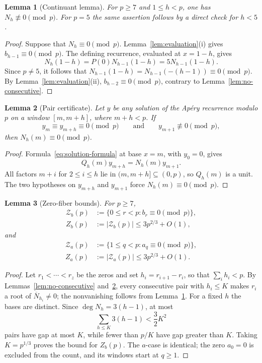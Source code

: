 \documentclass[11pt]{amsart}
\theoremstyle{plain}
\newtheorem{lemma}{Lemma}
\theoremstyle{remark}
\begin{document}
\begin{lemma}[Continuant lemma]\label{lem:continuant}
For $p\geq7$ and $1\leq h<p$, one has
$N_h\not\equiv0\pmod p$.  For $p=5$ the same assertion follows by a
direct check for $h<5$.
\end{lemma}

\begin{proof}
Suppose that $N_h\equiv0\pmod p$.  Lemma~\ref{lem:evaluation}(i) gives
$b_{h-1}\equiv0\pmod p$.  The defining recurrence, evaluated at
$x=1-h$, gives
\[
 N_h(1-h)=P(0)N_{h-1}(1-h)=5N_{h-1}(1-h).
\]
Since $p\neq5$, it follows that
$N_{h-1}(1-h)=N_{h-1}(-(h-1))\equiv0\pmod p$.  By
Lemma~\ref{lem:evaluation}(ii), $b_{h-2}\equiv0\pmod p$, contrary to
Lemma~\ref{lem:no-consecutive}.
\end{proof}

\begin{lemma}[Pair certificate]\label{lem:pair-certificate}
Let $y$ be any solution of the Ap\'ery recurrence modulo $p$ on a window
$[m,m+h]$, where $m+h<p$.  If
\[
 y_m\equiv y_{m+h}\equiv0\pmod p
 \qquad\text{and}\qquad
 y_{m+1}\not\equiv0\pmod p,
\]
then $N_h(m)\equiv0\pmod p$.
\end{lemma}

\begin{proof}
Formula~\eqref{eq:solution-formula} at base $x=m$, with $y_0=0$, gives
\[
 Q_h(m)y_{m+h}=N_h(m)y_{m+1}.
\]
All factors $m+i$ for $2\leq i\leq h$ lie in
$(m,m+h]\subseteq(0,p)$, so $Q_h(m)$ is a unit.  The two hypotheses on
$y_{m+h}$ and $y_{m+1}$ force $N_h(m)\equiv0\pmod p$.
\end{proof}

\begin{lemma}[Zero-fiber bounds]\label{lem:zero-fiber}
For $p\geq7$,
\[
 \begin{aligned}
 \mathcal Z_b(p)&:=\{0\leq r<p:b_r\equiv0\pmod p\},\\
 Z_b(p)&:=|\mathcal Z_b(p)|\leq3p^{2/3}+O(1),
 \end{aligned}
\]
and
\[
 \begin{aligned}
 \mathcal Z_a(p)&:=\{1\leq q<p:a_q\equiv0\pmod p\},\\
 Z_a(p)&:=|\mathcal Z_a(p)|\leq3p^{2/3}+O(1).
 \end{aligned}
\]
\end{lemma}

\begin{proof}
Let $r_1<\cdots<r_z$ be the zeros and set
$h_i=r_{i+1}-r_i$, so that $\sum_i h_i<p$.  By
Lemmas~\ref{lem:no-consecutive} and~\ref{lem:pair-certificate}, every
consecutive pair with $h_i\leq K$ makes $r_i$ a root of
$\overline N_{h_i}\neq0$; the nonvanishing follows from
Lemma~\ref{lem:continuant}.  For a fixed $h$ the bases are distinct.
Since $\deg N_h=3(h-1)$, at most
\[
 \sum_{h\leq K}3(h-1)<\frac32K^2
\]
pairs have gap at most $K$, while fewer than $p/K$ have gap greater than
$K$.  Taking $K=p^{1/3}$ proves the bound for $Z_b(p)$.  The $a$-case is
identical; the zero $a_0=0$ is excluded from the count, and its windows
start at $q\geq1$.
\end{proof}
\end{document}
